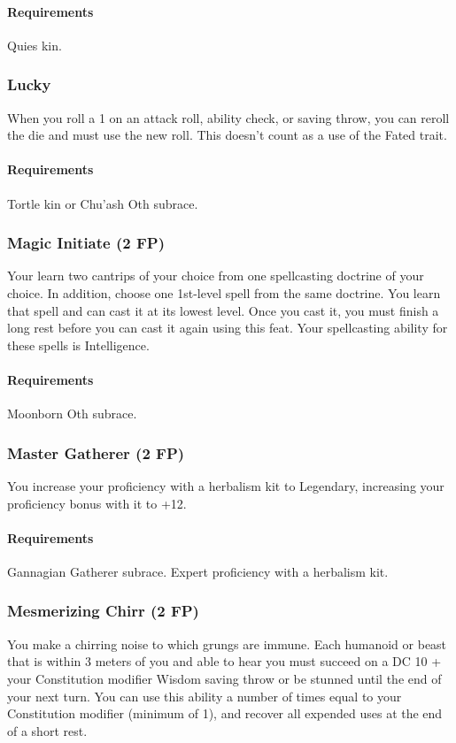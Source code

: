     \paragraph{Requirements} Quies kin.
\subsubsection{Lucky} \label{feat::lucky}
    When you roll a 1 on an attack roll, ability check, or saving throw, you can reroll the die and must use the new roll.
    This doesn't count as a use of the Fated trait.
    \paragraph{Requirements} Tortle kin or Chu'ash Oth subrace.
\subsubsection{Magic Initiate (2 FP)} \label{feat::magicinitiate}
    Your learn two cantrips of your choice from one spellcasting doctrine of your choice.
    In addition, choose one 1st-level spell from the same doctrine.
    You learn that spell and can cast it at its lowest level.
    Once you cast it, you must finish a long rest before you can cast it again using this feat.
    Your spellcasting ability for these spells is Intelligence.
    \paragraph{Requirements} Moonborn Oth subrace.
\subsubsection{Master Gatherer (2 FP)} \label{feat::mastergatherer}
    You increase your proficiency with a herbalism kit to Legendary, increasing your proficiency bonus with it to +12.
    \paragraph{Requirements} Gannagian Gatherer subrace. Expert proficiency with a herbalism kit.
\subsubsection{Mesmerizing Chirr (2 FP)} \label{feat::mesmerizingchirr}
    You make a chirring noise to which grungs are immune.
    Each humanoid or beast that is within 3 meters of you and able to hear you must succeed on a DC 10 + your Constitution modifier Wisdom saving throw or be stunned until the end of your next turn.
    You can use this ability a number of times equal to your Constitution modifier (minimum of 1), and recover all expended uses at the end of a short rest.
